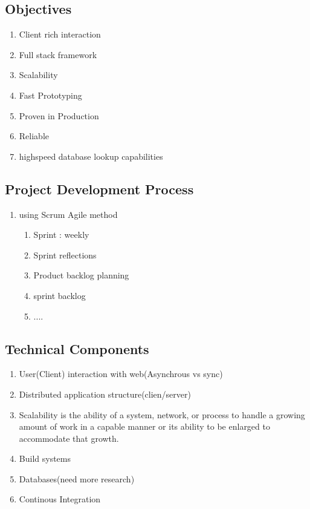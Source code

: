 
\subsection{Objectives}
\begin{enumerate}
	\item Client rich interaction
	\item Full stack framework
	\item Scalability
	\item Fast Prototyping
	\item Proven in Production
	\item Reliable
	\item highspeed database lookup capabilities
\end{enumerate}
\subsection{Project Development Process} %
\begin{enumerate}
	\item using Scrum Agile method
	\begin{enumerate}
		\item Sprint : weekly
		\item Sprint reflections
		\item Product backlog planning
		\item sprint backlog
		\item ....
	\end{enumerate}
\end{enumerate}
\subsection{Technical Components}
\begin{enumerate}
	\item User(Client) interaction with web(Asynchrous vs sync)
	\item Distributed application structure(clien/server)
	\item Scalability is the ability of a system, network, or process to handle a growing amount of work in a capable manner or its ability to be enlarged to accommodate that growth.
	\item Build systems
	\item Databases(need more research)
	\item Continous Integration
\end{enumerate}
